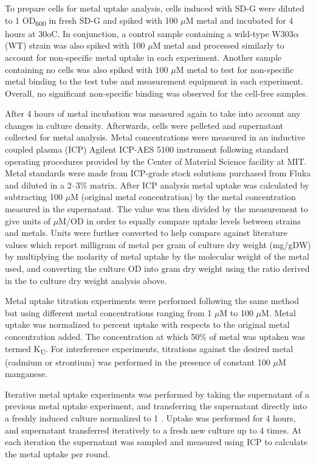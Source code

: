 \documentclass[../main/main]{subfiles}
\begin{document}
To prepare cells for metal uptake analysis, cells induced with SD-G were diluted to 1 OD\textsubscript{600} in fresh SD-G and spiked with 100 $\mu$M metal and incubated for 4 hours at 30oC. In conjunction, a control sample containing a wild-type W303$\alpha$ (WT) strain was also spiked with 100 $\mu$M metal and processed similarly to account for non-specific metal uptake in each experiment. Another sample containing no cells was also spiked with 100 $\mu$M metal to test for non-specific metal binding to the test tube and measurement equipment in each experiment. Overall, no significant non-specific binding was observed for the cell-free samples.

After 4 hours of metal incubation \OD{} was measured again to take into account any changes in culture density. Afterwards, cells were pelleted and supernatant collected for metal analysis. Metal concentrations were measured in an inductive coupled plasma (ICP) Agilent ICP-AES 5100 instrument following standard operating procedures provided by the Center of Material Science facility at MIT. Metal standards were made from ICP-grade stock solutions purchased from Fluka and diluted in a 2--3\%  matrix. After ICP analysis metal uptake was calculated by subtracting 100 $\mu$M (original metal concentration) by the metal concentration measured in the supernatant. The value was then divided by the \OD{} measurement to give units of $\mu$M/OD in order to equally compare uptake levels between strains and metals. Units were further converted to help compare against literature values which report milligram of metal per gram of culture dry weight  (mg/gDW) by multiplying the molarity of metal uptake by the molecular weight of the metal used, and converting the culture OD into gram dry weight using the ratio derived in the \OD{} to culture dry weight analysis above.

Metal uptake titration experiments were performed following the same method but using different metal concentrations ranging from 1 $\mu$M to 100 $\mu$M. Metal uptake was normalized to percent uptake with respects to the original metal concentration added. The concentration at which 50\% of metal was uptaken was termed K\textsubscript{U}. For interference experiments, titrations against the desired metal (cadmium or strontium) was performed in the presence of constant 100 $\mu$M manganese.

Iterative metal uptake experiments was performed by taking the supernatant of a previous metal uptake experiment, and transferring the supernatant directly into a freshly induced culture normalized to 1 \OD{}. Uptake was performed for 4 hours, and supernatant transferred iteratively to a fresh new culture up to 4 times. At each iteration the supernatant was sampled and measured using ICP to calculate the metal uptake per round.
\end{document}
